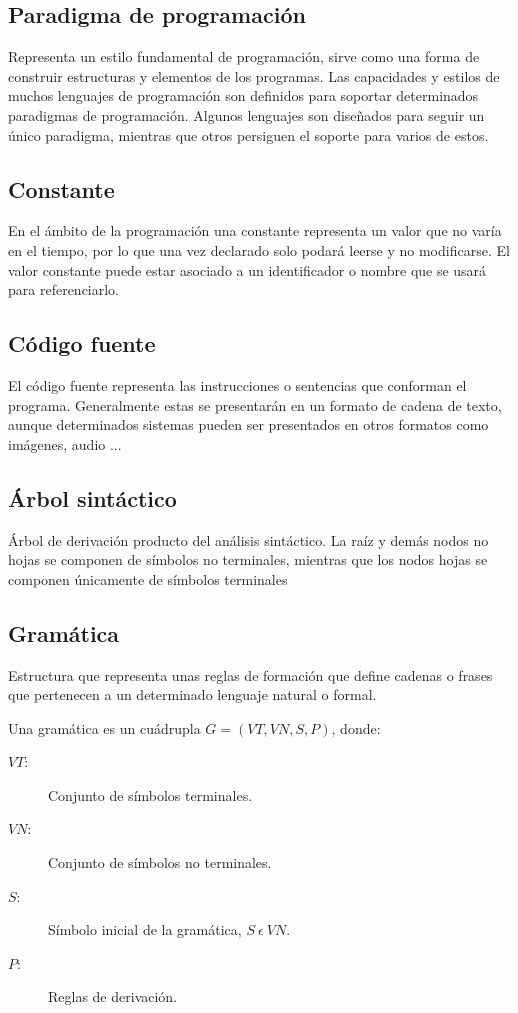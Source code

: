 \subsection {Paradigma de programación}
Representa un estilo fundamental de programación, sirve como una forma de construir estructuras y elementos de los programas. Las capacidades y estilos de muchos 
lenguajes de programación son definidos para soportar determinados paradigmas de programación. Algunos lenguajes son diseñados para seguir un único paradigma, mientras
que otros persiguen el soporte para varios de estos. 

\subsection {Constante}
En el ámbito de la programación una constante representa un valor que no varía en el tiempo, por lo que una vez declarado solo podará leerse y no modificarse. El valor constante 
puede estar asociado a un identificador o nombre que se usará para referenciarlo. 

\subsection {Código fuente}
El código fuente representa las instrucciones o sentencias que conforman el programa. Generalmente estas se presentarán en un formato de cadena de texto, aunque determinados sistemas
pueden ser presentados en otros formatos como imágenes, audio ...

\subsection {Árbol sintáctico}
Árbol de derivación producto del análisis sintáctico. La raíz y demás nodos no hojas se componen de símbolos no terminales, mientras que los nodos hojas se componen únicamente de símbolos
terminales

\subsection {Gramática}
Estructura que representa unas reglas de formación que define cadenas o frases que pertenecen a un determinado lenguaje natural o formal. 

Una gramática es un cuádrupla $ G = (VT, VN, S, P) $, donde: 

\begin {description}
\item[$VT$:] Conjunto de símbolos terminales.
\item[$VN$:] Conjunto de símbolos no terminales.
\item[$S$:] Símbolo inicial de la gramática, $S\ \epsilon\ VN$.
\item[$P$:] Reglas de derivación.
\end{description}

